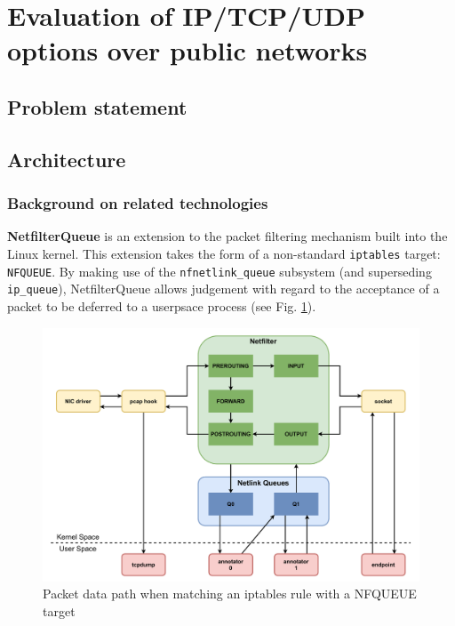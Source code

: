 \section{Evaluation of IP/TCP/UDP options over public networks}
\label{extend:ops}

\subsection{Problem statement}
\label{extend:ops:intro}


\subsection{Architecture}
\label{extend:ops:architecture}

\subsubsection{Background on related technologies}
\label{extend:ops:architecture:background}

\textbf{NetfilterQueue} is an extension to the packet filtering mechanism built into the Linux kernel. This extension takes the form of a non-standard \texttt{iptables} target: \texttt{NFQUEUE}. By making use of the \texttt{nfnetlink\_queue} subsystem (and superseding \texttt{ip\_queue}), NetfilterQueue allows judgement with regard to the acceptance of a packet to be deferred to a userpsace process (see Fig. \ref{extend:ops:fig:nfq}).

\begin{figure}[htb]
    \centering
    \includegraphics[width=\textwidth,keepaspectratio]{figures/netfilter_queue.pdf}
    \caption{Packet data path when matching an iptables rule with a NFQUEUE target}
    \label{extend:ops:fig:nfq}
\end{figure}

